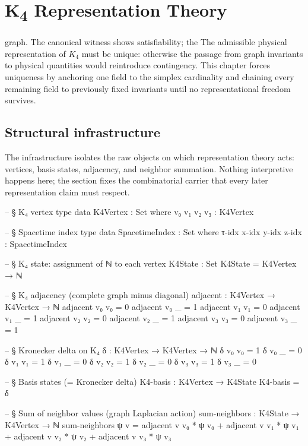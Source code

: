 \documentclass[11pt,a4paper]{book}
\begin{document}
\chapter{K\textsubscript{4} Representation Theory}

graph.  The canonical witness shows satisfiability; the
The admissible physical representation of $K_4$ must be unique: otherwise the passage from graph invariants to physical quantities would reintroduce contingency. This chapter forces uniqueness by anchoring one field to the simplex cardinality and chaining every remaining field to previously fixed invariants until no representational freedom survives.

\section{Structural infrastructure}

The infrastructure isolates the raw objects on which representation theory acts: vertices, basis states, adjacency, and neighbor summation. Nothing interpretive happens here; the section fixes the combinatorial carrier that every later representation claim must respect.

\begin{code}
-- § K₄ vertex type
data K4Vertex : Set where
  v₀ v₁ v₂ v₃ : K4Vertex

-- § Spacetime index type
data SpacetimeIndex : Set where
  τ-idx x-idx y-idx z-idx : SpacetimeIndex

-- § K₄ state: assignment of ℕ to each vertex
K4State : Set
K4State = K4Vertex → ℕ

-- § K₄ adjacency (complete graph minus diagonal)
adjacent : K4Vertex → K4Vertex → ℕ
adjacent v₀ v₀ = 0
adjacent v₀ _  = 1
adjacent v₁ v₁ = 0
adjacent v₁ _  = 1
adjacent v₂ v₂ = 0
adjacent v₂ _  = 1
adjacent v₃ v₃ = 0
adjacent v₃ _  = 1

-- § Kronecker delta on K₄
δ : K4Vertex → K4Vertex → ℕ
δ v₀ v₀ = 1
δ v₀ _  = 0
δ v₁ v₁ = 1
δ v₁ _  = 0
δ v₂ v₂ = 1
δ v₂ _  = 0
δ v₃ v₃ = 1
δ v₃ _  = 0

-- § Basis states (= Kronecker delta)
K4-basis : K4Vertex → K4State
K4-basis = δ

-- § Sum of neighbor values (graph Laplacian action)
sum-neighbors : K4State → K4Vertex → ℕ
sum-neighbors ψ v = adjacent v v₀ * ψ v₀ + adjacent v v₁ * ψ v₁
                  + adjacent v v₂ * ψ v₂ + adjacent v v₃ * ψ v₃
\end{code}
\end{document}
